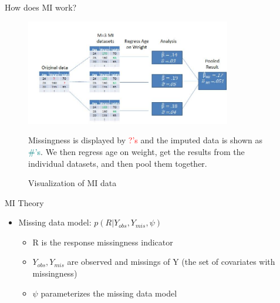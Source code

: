 \begin{frame}{How does MI work?}
 \begin{figure}[h!]
  \centering
    \includegraphics[width=0.8\textwidth]{mi_example_full.jpg}
  \caption{Visualization of MI data}
\label{fig:miexample}
\medskip
\small
Missingness is displayed by \textcolor{red}{?'s} and the imputed data is shown  as \textcolor{teal}{\#'s}.
We then regress age on weight, get the results from the individual datasets, and then pool them together.
\end{figure}
\end{frame}

\begin{frame}{MI Theory}
 \begin{itemize}
  \item Missing data model: $p(R|Y_{obs},Y_{mis},\psi)$
  \begin{itemize}
     \item R is the response missingness indicator
   \item $Y_{obs},Y_{mis}$ are observed and missings of Y (the set of covariates with missingness)
   \item $\psi$ parameterizes the missing data model
  \end{itemize}

 \end{itemize}

\end{frame}



